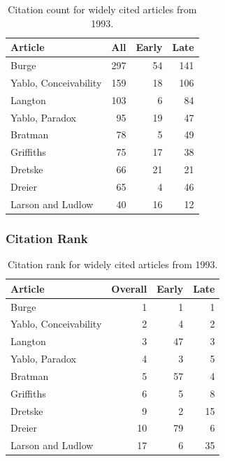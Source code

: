 \documentclass[
  10pt,
  letterpaper,
  DIV=11,
  numbers=noendperiod,
  twoside]{scrartcl}
\begin{document}
\begin{longtable}[]{@{}lrrr@{}}

\caption{\label{tbl-citation-count-1993}Citation count for widely cited
articles from 1993.}

\tabularnewline

\toprule\noalign{}
Article & All & Early & Late \\
\midrule\noalign{}
\endhead
\bottomrule\noalign{}
\endlastfoot
Burge & 297 & 54 & 141 \\
Yablo, Conceivability & 159 & 18 & 106 \\
Langton & 103 & 6 & 84 \\
Yablo, Paradox & 95 & 19 & 47 \\
Bratman & 78 & 5 & 49 \\
Griffiths & 75 & 17 & 38 \\
Dretske & 66 & 21 & 21 \\
Dreier & 65 & 4 & 46 \\
Larson and Ludlow & 40 & 16 & 12 \\

\end{longtable}

\subsubsection*{Citation Rank}\label{citation-rank-17}

\begin{longtable}[]{@{}lrrr@{}}

\caption{\label{tbl-citation-rank-1993}Citation rank for widely cited
articles from 1993.}

\tabularnewline

\toprule\noalign{}
Article & Overall & Early & Late \\
\midrule\noalign{}
\endhead
\bottomrule\noalign{}
\endlastfoot
Burge & 1 & 1 & 1 \\
Yablo, Conceivability & 2 & 4 & 2 \\
Langton & 3 & 47 & 3 \\
Yablo, Paradox & 4 & 3 & 5 \\
Bratman & 5 & 57 & 4 \\
Griffiths & 6 & 5 & 8 \\
Dretske & 9 & 2 & 15 \\
Dreier & 10 & 79 & 6 \\
Larson and Ludlow & 17 & 6 & 35 \\

\end{longtable}
\end{document}

